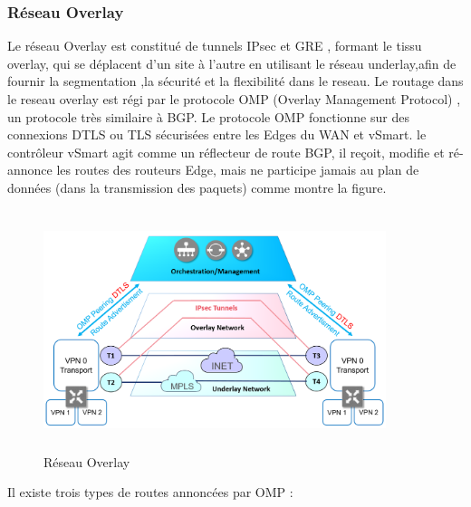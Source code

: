 \subsubsection{Réseau Overlay }

Le réseau Overlay est constitué de tunnels IPsec et GRE , formant le tissu overlay, qui se déplacent d'un site à l'autre en utilisant le réseau underlay,afin de fournir la segmentation ,la sécurité et la flexibilité dans le reseau.
Le routage dans le reseau overlay est régi par le protocole OMP (Overlay Management Protocol) , un protocole très similaire à BGP. Le protocole OMP fonctionne sur des connexions DTLS ou TLS sécurisées entre les Edges du WAN et vSmart. le contrôleur vSmart agit comme un réflecteur de route BGP, il reçoit, modifie et ré-annonce les routes des routeurs Edge, mais ne participe jamais au plan de données (dans la transmission des paquets) comme montre la figure.
\begin{figure} [H]
	\begin{center}
		\centering
		\hspace*{-0.5cm}
		\includegraphics[height=7cm,width=10cm]{../image/Overlay}
	\end{center}
	\caption{Réseau Overlay}
\end{figure} 

Il existe trois types de routes annoncées par OMP :

